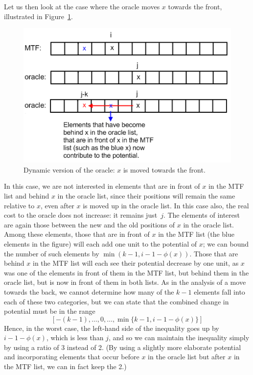 \documentclass{article}
\begin{document}
Let us then look at the case where the oracle moves $x$ towards the front,
illustrated in Figure~\ref{fig:figure5}.
\begin{figure}[h!]%
  \centering
    \includegraphics[scale = 0.5]{figures/figure5.png}%
  \caption{Dynamic version of the oracle: $x$ is moved towards the front.}%
  \label{fig:figure5}%
\end{figure}%
In this case, we are not interested in elements that are in front of $x$ in the
MTF list and behind $x$ in the oracle list, since their positions will remain
the same relative to $x$, even after $x$ is moved up in the oracle list.
In this case also, the real cost to the oracle does not increase: it remains
just~$j$.
The elements of interest are again those between the new and the old positions
of $x$ in the oracle list.  Among these elements, those that are in front of
$x$ in the MTF list (the blue elements in the figure) will each add one unit
to the potential of $x$; we can bound the number of such elements by
$\min(k-1, i-1-\phi(x))$.
Those that are behind $x$ in the MTF list will each see their potential
decrease by one unit, as $x$ was one of the elements in front of them
in the MTF list, but behind them in the oracle list, but is now in front
of them in both lists.  As in the analysis of a move towards the back,
we cannot determine how many of the $k-1$ elements fall into each of
these two categories, but we can state that the combined change in potential
must be in the range
  $$[-(k-1),\ldots,0,\ldots,\min\{k-1,i-1-\phi(x)\}]$$
Hence, in the worst case, the left-hand side of the inequality goes up by
$i-1-\phi(x)$, which is less than $j$, and so we can maintain the inequality
simply by using a ratio of 3 instead of 2.  (By using a slightly more
elaborate potential and incorporating elements that occur before $x$ in the oracle list but after $x$ in the MTF list, 
we can in fact keep the 2.)
\end{document}
